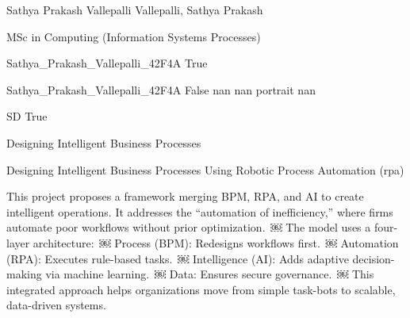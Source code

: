 
\begingroup{}\relax



\def\Key{Sathya_Prakash_Vallepalli_42F4A}

{Sathya Prakash Vallepalli}
{Vallepalli, Sathya Prakash}

{MSc in Computing (Information Systems Processes)}

{Sathya_Prakash_Vallepalli_42F4A}
{True}

{Sathya_Prakash_Vallepalli_42F4A}
{False}
{nan}
{nan}
{portrait}
{nan}

{SD}
{True}

{Designing Intelligent Business Processes}

{Designing Intelligent Business Processes Using Robotic Process Automation (rpa)}

{This project proposes a framework merging BPM, RPA, and AI to create intelligent operations. It addresses the \textquotedblleft{}automation of inefficiency,\textquotedblright{} where firms automate poor workflows without prior optimization. ￼
The model uses a four-layer architecture: ￼
\ITEM Process (BPM): Redesigns workflows first. ￼
\ITEM Automation (RPA): Executes rule-based tasks. ￼
\ITEM Intelligence (AI): Adds adaptive decision-making via machine learning. ￼
\ITEM Data: Ensures secure governance. ￼
This integrated approach helps organizations move from simple task-bots to scalable, data-driven systems.}

